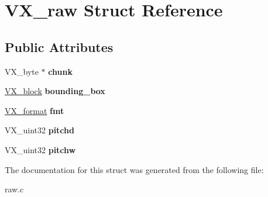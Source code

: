 \hypertarget{structVX__raw}{\section{V\-X\-\_\-raw Struct Reference}
\label{structVX__raw}
}
\subsection*{Public Attributes}
\begin{DoxyCompactItemize}
\item 
\hypertarget{structVX__raw_a63518255e085e59616e467e4d429d2ae}{V\-X\-\_\-byte $\ast$ {\bfseries chunk}}\label{structVX__raw_a63518255e085e59616e467e4d429d2ae}

\item 
\hypertarget{structVX__raw_acfb5f683c22d4fd47378d318ec68d21f}{\hyperlink{structVX__block}{V\-X\-\_\-block} {\bfseries bounding\-\_\-box}}\label{structVX__raw_acfb5f683c22d4fd47378d318ec68d21f}

\item 
\hypertarget{structVX__raw_aa7cf241dd6fd3487beba4ac54c606f34}{\hyperlink{structVX__format}{V\-X\-\_\-format} {\bfseries fmt}}\label{structVX__raw_aa7cf241dd6fd3487beba4ac54c606f34}

\item 
\hypertarget{structVX__raw_a470fd84e57990d5a6ba99b3f6016571c}{V\-X\-\_\-uint32 {\bfseries pitchd}}\label{structVX__raw_a470fd84e57990d5a6ba99b3f6016571c}

\item 
\hypertarget{structVX__raw_a7b8886cf5b147bfb2d7d236114c81f46}{V\-X\-\_\-uint32 {\bfseries pitchw}}\label{structVX__raw_a7b8886cf5b147bfb2d7d236114c81f46}

\end{DoxyCompactItemize}


The documentation for this struct was generated from the following file\-:\begin{DoxyCompactItemize}
\item 
raw.\-c\end{DoxyCompactItemize}
